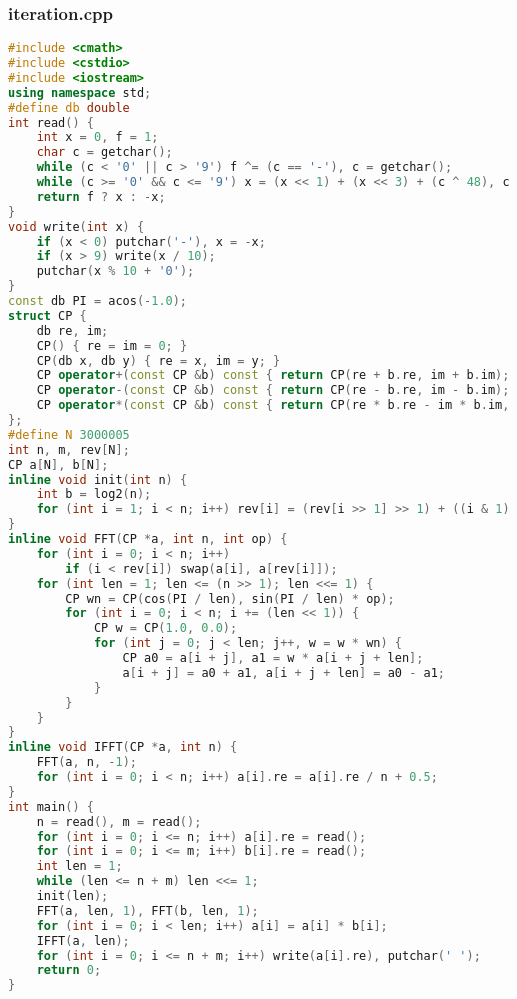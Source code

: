 \documentclass[9pt, a4paper, oneside]{book}
\begin{document}
\subsubsection{iteration.cpp}
\begin{lstlisting}[language={C++}]
#include <cmath>
#include <cstdio>
#include <iostream>
using namespace std;
#define db double
int read() {
    int x = 0, f = 1;
    char c = getchar();
    while (c < '0' || c > '9') f ^= (c == '-'), c = getchar();
    while (c >= '0' && c <= '9') x = (x << 1) + (x << 3) + (c ^ 48), c = getchar();
    return f ? x : -x;
}
void write(int x) {
    if (x < 0) putchar('-'), x = -x;
    if (x > 9) write(x / 10);
    putchar(x % 10 + '0');
}
const db PI = acos(-1.0);
struct CP {
    db re, im;
    CP() { re = im = 0; }
    CP(db x, db y) { re = x, im = y; }
    CP operator+(const CP &b) const { return CP(re + b.re, im + b.im); }
    CP operator-(const CP &b) const { return CP(re - b.re, im - b.im); }
    CP operator*(const CP &b) const { return CP(re * b.re - im * b.im, re * b.im + im * b.re); }
};
#define N 3000005
int n, m, rev[N];
CP a[N], b[N];
inline void init(int n) {
    int b = log2(n);
    for (int i = 1; i < n; i++) rev[i] = (rev[i >> 1] >> 1) + ((i & 1) << (b - 1));
}
inline void FFT(CP *a, int n, int op) {
    for (int i = 0; i < n; i++)
        if (i < rev[i]) swap(a[i], a[rev[i]]);
    for (int len = 1; len <= (n >> 1); len <<= 1) {
        CP wn = CP(cos(PI / len), sin(PI / len) * op);
        for (int i = 0; i < n; i += (len << 1)) {
            CP w = CP(1.0, 0.0);
            for (int j = 0; j < len; j++, w = w * wn) {
                CP a0 = a[i + j], a1 = w * a[i + j + len];
                a[i + j] = a0 + a1, a[i + j + len] = a0 - a1;
            }
        }
    }
}
inline void IFFT(CP *a, int n) {
    FFT(a, n, -1);
    for (int i = 0; i < n; i++) a[i].re = a[i].re / n + 0.5;
}
int main() {
    n = read(), m = read();
    for (int i = 0; i <= n; i++) a[i].re = read();
    for (int i = 0; i <= m; i++) b[i].re = read();
    int len = 1;
    while (len <= n + m) len <<= 1;
    init(len);
    FFT(a, len, 1), FFT(b, len, 1);
    for (int i = 0; i < len; i++) a[i] = a[i] * b[i];
    IFFT(a, len);
    for (int i = 0; i <= n + m; i++) write(a[i].re), putchar(' ');
    return 0;
}\end{lstlisting}
\end{document}
